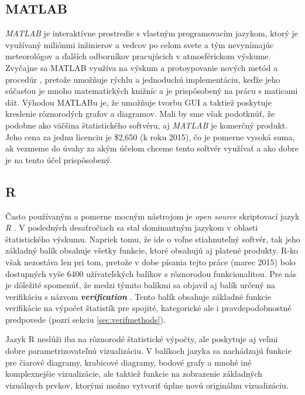 \subsection{MATLAB}
\textit{MATLAB} je interaktívne prostredie s vlastným programovacím jazykom, ktorý je využívaný miliónmi inžinierov a vedcov po celom svete \cite{Matlab} a tým nevynímajúc meteorológov a ďalších odborníkov pracujúcich v atmosférickom výskume. 
Zvyčajne sa MATLAB využíva na výskum a protoypovanie nových metód a procedúr \cite{VerifSoft}, pretože umožňuje rýchlu a jednoduchú implementáciu, keďže jeho súčasťou je mnoho matematických knižníc a je prispôsobený na prácu s maticami dát.
Výhodou MATLABu je, že umožňuje tvorbu GUI a taktiež poskytuje kreslenie rôznorodých grafov a diagramov.
Mali by sme však podotknúť, že podobne ako väčšina štatistického softvéru, aj \textit{MATLAB} je komerčný produkt. Jeho cena za jednu licenciu je \$2,650 (k roku 2015), čo je pomerne vysoká suma, ak vezmeme do úvahy za akým účelom chceme tento softvér využívať a ako dobre je na tento účel prispôsobený.

\subsection{R}
\label{subsec:R}
Často používaným a pomerne mocným nástrojom je \textit{open source} skriptovací jazyk \textit{R} \cite{RProject}. V posledných desaťročiach sa stal dominantným jazykom v oblasti štatistického výskumu. Napriek tomu, že ide o voľne stiahnuteľný softvér, tak jeho základný balík obsahuje všetky funkcie, ktoré obsahujú aj platené produkty. R-ko však nezostáva len pri tom, pretože v dobe písania tejto práce (marec 2015) bolo dostupných vyše 6400 užívateľských balíkov s rôznorodou funkcionalitou. Pre nás je dôležité spomenúť, že medzi týmito balíkmi sa objavil aj balík určený na verifikáciu s názvom \textit{\textbf{verification}} \cite{VerifPackage}. Tento balík obsahuje základné funkcie verifikácie na výpočet štatistík pre spojité, kategorické ale i pravdepodobnostné predpovede (pozri sekciu \ref{sec:verifmethods}). 

Jazyk R neslúži iba na rôznorodé štatistické výpočty, ale poskytuje aj veľmi dobre parametrizovateľnú vizualizáciu. V balíkoch jazyka sa nachádzajú funkcie pre čiarové diagramy, krabicové diagramy, bodové grafy a mnohé iné komplexnejšie vizualizácie, ale taktiež funkcie na zobrazenie základných vizuálnych prvkov, ktorými možno vytvoriť úplne novú originálnu vizualizáciu.


